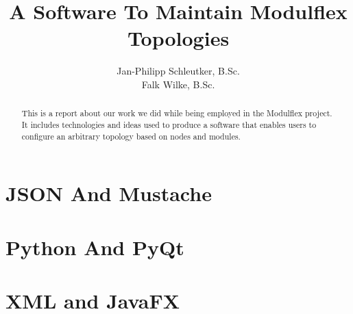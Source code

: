 \documentclass[10pt,a4paper]{report}
\begin{document}
	\title{A Software To Maintain Modulflex Topologies}
	\author{Jan-Philipp Schleutker, B.Sc.\\Falk Wilke, B.Sc.}
	\maketitle
	\begin{abstract}
		This is a report about our work we did while being employed in the Modulflex project. 
		It includes technologies and ideas used to produce a software that enables users to configure an arbitrary topology based on nodes and modules. 
	\end{abstract}
	\tableofcontents
	
	\chapter{JSON And Mustache}
	
	\chapter{Python And PyQt}
	
	\chapter{XML and JavaFX}
\end{document}

